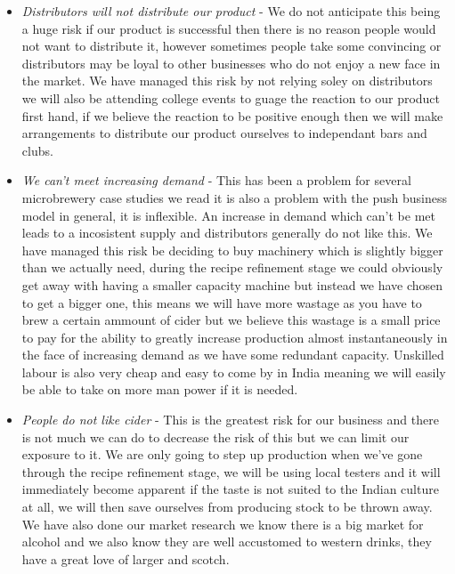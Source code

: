 \documentclass[11pt]{article}
\begin{document}
\begin{itemize}
\item \emph{Distributors will not distribute our product} - We do not 
anticipate this being a huge risk if our product is successful then there is no
reason people would not want to distribute it, however sometimes people take 
some convincing or distributors may be loyal to other businesses who do not 
enjoy a new face in the market. We have managed this risk by not relying soley 
on distributors we will also be attending college events to guage the reaction 
to our product first hand, if we believe the reaction to be positive enough then
we will make arrangements to distribute our product ourselves to independant 
bars and clubs. 
\item \emph{We can't meet increasing demand} - This has been a problem for 
several microbrewery case studies we read it is also a problem with the push 
business model in general, it is inflexible. An increase in demand which can't 
be met leads to a incosistent supply and distributors generally do not like 
this. We have managed this risk be deciding to buy machinery which is slightly 
bigger than we actually need, during the recipe refinement stage we could 
obviously get away with having a smaller capacity machine but instead we have 
chosen to get a bigger one, this means we will have more wastage as you have to
brew a certain ammount of cider but we believe this wastage is a small price to 
pay for the ability to greatly increase production almost instantaneously in the
 face of increasing demand as we have some redundant capacity. Unskilled labour 
is also very cheap and easy to come by in India meaning we will easily be able 
to take on more man power if it is needed. 
\item \emph{People do not like cider} - This is the greatest risk for our
business and there is not much we can do to decrease the risk of this but we can
limit our exposure to it. We are only going to step up production when we've 
gone through the recipe refinement stage, we will be using local testers and it 
will immediately become apparent if the taste is not suited to the Indian 
culture at all, we will then save ourselves from producing stock to be thrown 
away. We have also done our market research we know there is a big market for 
alcohol and we also know they are well accustomed to western drinks, they have a
great love of larger and scotch. 
\end{itemize}

\newpage
\end{document}
